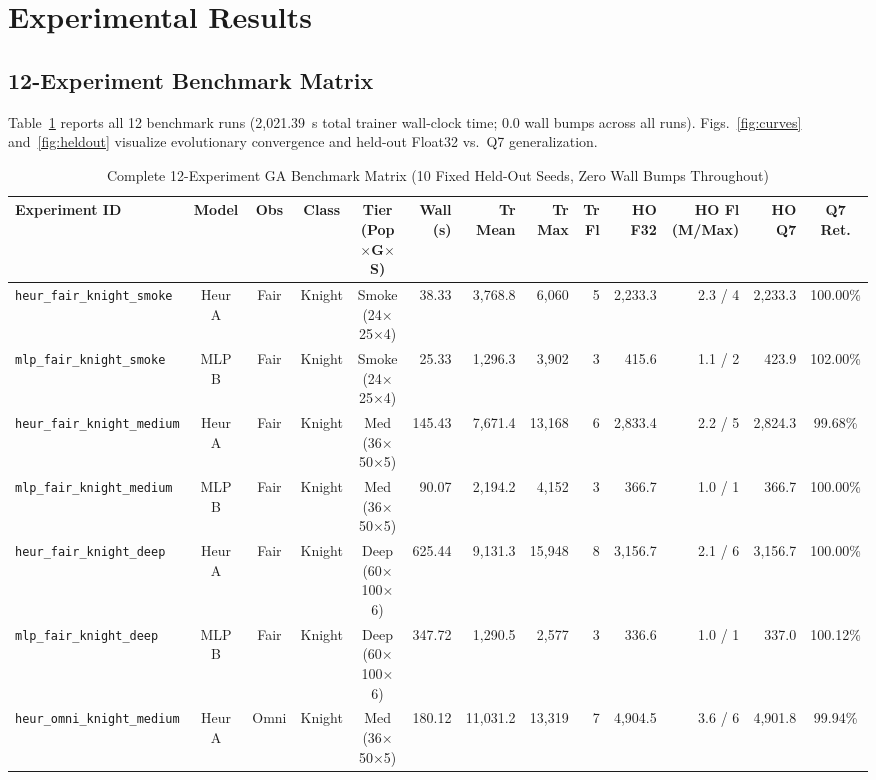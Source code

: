 \documentclass[conference]{IEEEtran}
\begin{document}
\section{Experimental Results}

\subsection{12-Experiment Benchmark Matrix}
Table~\ref{tab:bench} reports all 12 benchmark runs (2,021.39~s total trainer wall-clock time; 0.0 wall bumps across all runs). Figs.~\ref{fig:curves} and~\ref{fig:heldout} visualize evolutionary convergence and held-out Float32 vs.\ Q7 generalization.

\begin{table}[t]
\centering
\caption{Complete 12-Experiment GA Benchmark Matrix (10 Fixed Held-Out Seeds, Zero Wall Bumps Throughout)}
\label{tab:bench}
\scriptsize
\setlength{\tabcolsep}{3.5pt}
\begin{tabular}{@{}lccccrrrrrrrc@{}}
\toprule
Experiment ID & Model & Obs & Class & Tier (Pop$\times$G$\times$S) & Wall (s) & Tr Mean & Tr Max & Tr Fl & HO F32 & HO Fl (M/Max) & HO Q7 & Q7 Ret. \\
\midrule
\texttt{heur\_fair\_knight\_smoke}  & Heur A & Fair & Knight   & Smoke (24$\times$25$\times$4)  &  38.33 &  3,768.8 &  6,060 & 5 & 2,233.3 & 2.3 / 4 & 2,233.3 & 100.00\% \\
\texttt{mlp\_fair\_knight\_smoke}   & MLP B  & Fair & Knight   & Smoke (24$\times$25$\times$4)  &  25.33 &  1,296.3 &  3,902 & 3 &   415.6 & 1.1 / 2 &   423.9 & 102.00\% \\
\texttt{heur\_fair\_knight\_medium} & Heur A & Fair & Knight   & Med (36$\times$50$\times$5)    & 145.43 &  7,671.4 & 13,168 & 6 & 2,833.4 & 2.2 / 5 & 2,824.3 &  99.68\% \\
\texttt{mlp\_fair\_knight\_medium}  & MLP B  & Fair & Knight   & Med (36$\times$50$\times$5)    &  90.07 &  2,194.2 &  4,152 & 3 &   366.7 & 1.0 / 1 &   366.7 & 100.00\% \\
\texttt{heur\_fair\_knight\_deep}   & Heur A & Fair & Knight   & Deep (60$\times$100$\times$6)  & 625.44 &  9,131.3 & 15,948 & 8 & 3,156.7 & 2.1 / 6 & 3,156.7 & 100.00\% \\
\texttt{mlp\_fair\_knight\_deep}    & MLP B  & Fair & Knight   & Deep (60$\times$100$\times$6)  & 347.72 &  1,290.5 &  2,577 & 3 &   336.6 & 1.0 / 1 &   337.0 & 100.12\% \\
\texttt{heur\_omni\_knight\_medium} & Heur A & Omni & Knight   & Med (36$\times$50$\times$5)    & 180.12 & 11,031.2 & 13,319 & 7 & 4,904.5 & 3.6 / 6 & 4,901.8 &  99.94\% \\

\end{tabular}
\end{table}
\end{document}
